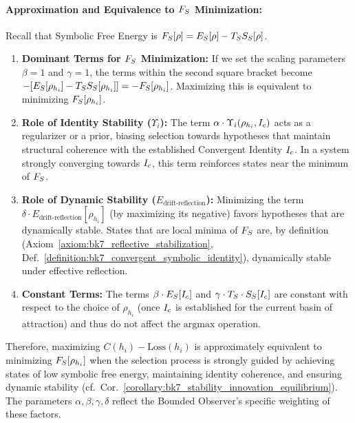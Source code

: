 \paragraph{Approximation and Equivalence to \(F_S\) Minimization:}
Recall that Symbolic Free Energy is \(F_S[\rho] = E_S[\rho] - T_S S_S[\rho]\).
\begin{enumerate}
    \item \textbf{Dominant Terms for \(F_S\) Minimization:} If we set the scaling parameters \(\beta = 1\) and \(\gamma = 1\), the terms within the second square bracket become \(-[E_S[\rho_{h_i}] - T_S S_S[\rho_{h_i}]] = -F_S[\rho_{h_i}]\). Maximizing this is equivalent to minimizing \(F_S[\rho_{h_i}]\).
    \item \textbf{Role of Identity Stability (\(\Upsilon_i\)):} The term \(\alpha \cdot \Upsilon_i(\rho_{h_i}, I_c)\) acts as a regularizer or a prior, biasing selection towards hypotheses that maintain structural coherence with the established Convergent Identity \(I_c\). In a system strongly converging towards \(I_c\), this term reinforces states near the minimum of \(F_S\).
    \item \textbf{Role of Dynamic Stability (\(E_{\text{drift-reflection}}\)):} Minimizing the term \(\delta \cdot E_{\text{drift-reflection}}[\rho_{h_i}]\) (by maximizing its negative) favors hypotheses that are dynamically stable. States that are local minima of \(F_S\) are, by definition (Axiom~\ref{axiom:bk7_reflective_stabilization}, Def.~\ref{definition:bk7_convergent_symbolic_identity}), dynamically stable under effective reflection.
    \item \textbf{Constant Terms:} The terms \(\beta \cdot E_S[I_c]\) and \(\gamma \cdot T_S \cdot S_S[I_c]\) are constant with respect to the choice of \(\rho_{h_i}\) (once \(I_c\) is established for the current basin of attraction) and thus do not affect the \(\text{argmax}\) operation.
\end{enumerate}
Therefore, maximizing \(C(h_i) - \text{Loss}(h_i)\) is approximately equivalent to minimizing \(F_S[\rho_{h_i}]\) when the selection process is strongly guided by achieving states of low symbolic free energy, maintaining identity coherence, and ensuring dynamic stability (cf.~Cor.~\ref{corollary:bk7_stability_innovation_equilibrium}). The parameters \(\alpha, \beta, \gamma, \delta\) reflect the Bounded Observer's specific weighting of these factors.
